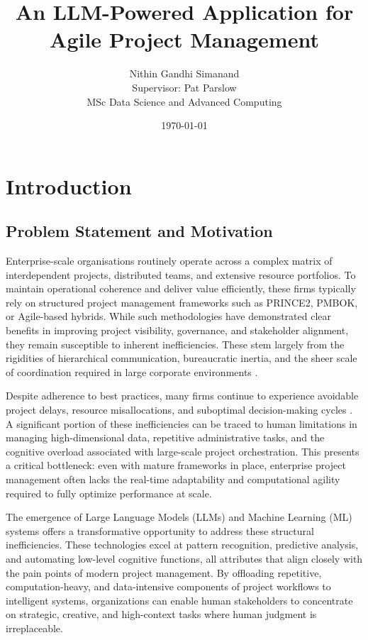 \documentclass{report}
\title{\textbf{An LLM-Powered Application for Agile Project Management}}
\author{Nithin Gandhi Simanand \\ Supervisor: Pat Parslow \\ MSc Data Science and Advanced Computing}
\date{\today}
\begin{document}
\maketitle

\tableofcontents
\newpage

\chapter{Introduction}  %
\section{Problem Statement and Motivation}

Enterprise-scale organisations routinely operate across a complex matrix of interdependent projects, distributed teams, and extensive resource portfolios. To maintain operational coherence and deliver value efficiently, these firms typically rely on structured project management frameworks such as PRINCE2, PMBOK, or Agile-based hybrids. While such methodologies have demonstrated clear benefits in improving project visibility, governance, and stakeholder alignment, they remain susceptible to inherent inefficiencies. These stem largely from the rigidities of hierarchical communication, bureaucratic inertia, and the sheer scale of coordination required in large corporate environments \parencite{pricaEnhancingProjectEfficiency2025}.

Despite adherence to best practices, many firms continue to experience avoidable project delays, resource misallocations, and suboptimal decision-making cycles \parencite{mankinsTurningGreatStrategy2005}. A significant portion of these inefficiencies can be traced to human limitations in managing high-dimensional data, repetitive administrative tasks, and the cognitive overload associated with large-scale project orchestration. This presents a critical bottleneck: even with mature frameworks in place, enterprise project management often lacks the real-time adaptability and computational agility required to fully optimize performance at scale.

The emergence of Large Language Models (LLMs) and Machine Learning (ML) systems offers a transformative opportunity to address these structural inefficiencies. These technologies excel at pattern recognition, predictive analysis, and automating low-level cognitive functions, all attributes that align closely with the pain points of modern project management. By offloading repetitive, computation-heavy, and data-intensive components of project workflows to intelligent systems, organizations can enable human stakeholders to concentrate on strategic, creative, and high-context tasks where human judgment is irreplaceable.
\end{document}
